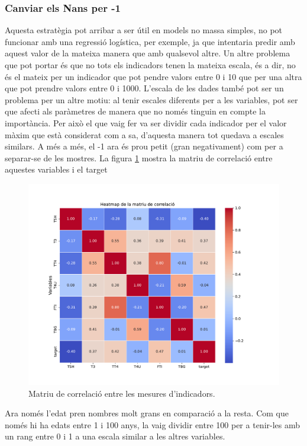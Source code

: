 \documentclass[9pt,a4paper,twoside]{tau-class/tau}
\begin{document}
    \subsubsection{Canviar els Nans per -1}
    Aquesta estratègia pot arribar a ser útil en models no massa simples, no pot funcionar amb una regressió logística, per exemple, ja que intentaria predir amb aquest valor de la mateixa manera que amb qualsevol altre. Un altre problema que pot portar és que no tots els indicadors tenen la mateixa escala, és a dir, no és el mateix per un indicador que pot pendre valors entre 0 i 10 que per una altra que pot prendre valors entre 0 i 1000. L'escala de les dades també pot ser un problema per un altre motiu: al tenir escales diferents per a les variables, pot ser que afecti als paràmetres de manera que no només tinguin en compte la importància. Per això el que vaig fer va ser dividir cada indicador per el valor màxim que està considerat com a sa, d'aquesta manera tot quedava a escales similars. A més a més, el -1 ara és prou petit (gran negativament) com per a separar-se de les mostres. La figura \ref{fig:figure4} mostra la matriu de correlació entre aquestes variables i el target
    \begin{figure}[H]
		\centering
		\includegraphics[width=0.75\columnwidth]{correlation_matrix_atributs_df_fillna.pdf}
		\caption{Matriu de correlació entre les mesures d'indicadors.}
		\label{fig:figure4}
	\end{figure}

    Ara només l'edat pren nombres molt grans en comparació a la resta. Com que només hi ha edats entre 1 i 100 anys, la vaig dividir entre 100 per a tenir-les amb un rang entre 0 i 1 a una escala similar a les altres variables.
\end{document}
